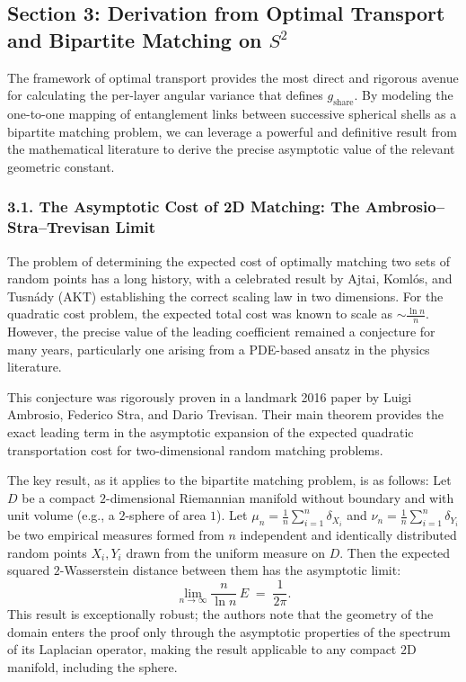\documentclass[11pt]{article}
\begin{document}
\subsection*{Section 3: Derivation from Optimal Transport and Bipartite Matching on $S^2$}
The framework of optimal transport provides the most direct and rigorous avenue for calculating the per-layer angular variance that defines $g_{\mathrm{share}}$. By modeling the one-to-one mapping of entanglement links between successive spherical shells as a bipartite matching problem, we can leverage a powerful and definitive result from the mathematical literature to derive the precise asymptotic value of the relevant geometric constant.

\subsubsection*{3.1. The Asymptotic Cost of 2D Matching: The Ambrosio–Stra–Trevisan Limit}
The problem of determining the expected cost of optimally matching two sets of random points has a long history, with a celebrated result by Ajtai, Komlós, and Tusnády (AKT) establishing the correct scaling law in two dimensions. For the quadratic cost problem, the expected total cost was known to scale as $\sim \frac{\ln n}{n}$. However, the precise value of the leading coefficient remained a conjecture for many years, particularly one arising from a PDE-based ansatz in the physics literature.

This conjecture was rigorously proven in a landmark 2016 paper by Luigi Ambrosio, Federico Stra, and Dario Trevisan. Their main theorem provides the exact leading term in the asymptotic expansion of the expected quadratic transportation cost for two-dimensional random matching problems.

The key result, as it applies to the bipartite matching problem, is as follows: Let $D$ be a compact $2$-dimensional Riemannian manifold without boundary and with unit volume (e.g., a $2$-sphere of area $1$). Let $\mu_n = \frac{1}{n}\sum_{i=1}^n \delta_{X_i}$ and $\nu_n = \frac{1}{n}\sum_{i=1}^n \delta_{Y_i}$ be two empirical measures formed from $n$ independent and identically distributed random points $X_i, Y_i$ drawn from the uniform measure on $D$. Then the expected squared $2$-Wasserstein distance between them has the asymptotic limit:
\[
\lim_{n\to\infty} \frac{n}{\ln n} \, E \;=\; \frac{1}{2\pi}.
\]
This result is exceptionally robust; the authors note that the geometry of the domain enters the proof only through the asymptotic properties of the spectrum of its Laplacian operator, making the result applicable to any compact $2$D manifold, including the sphere.
\end{document}
